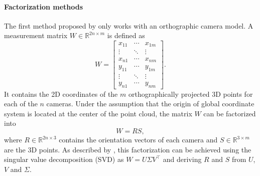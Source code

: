         	\paragraph{Factorization methods}
        		The first method proposed by \cite{tomasi1992factorization} only works with an orthographic camera model.
        		A measurement matrix $W \in \mathbb{R}^{2n \times m}$ is defined as
        		\begin{equation}
        			W =
        			\begin{bmatrix}
        			x_{11} & \cdots & x_{1m} \\ 
        			\vdots & \ddots & \vdots \\ 
        			x_{n1} & \cdots & x_{nm} \\ 
        			y_{11} & \cdots & y_{1m} \\ 
        			\vdots & \ddots  & \vdots \\ 
        			y_{n1} & \cdots & y_{nm}
        			\end{bmatrix}. 
        		\end{equation}
        		It contains the 2D coordinates of the $m$ orthographically projected 3D points for each of the $n$ cameras.
        		Under the assumption that the origin of global coordinate system is located at the center of the point cloud, the matrix $W$ can be factorized into
        		\begin{equation}
        			W = RS,
        		\end{equation}
        		where $R \in \mathbb{R}^{2n \times 3}$ contains the orientation vectors of each camera and $S \in \mathbb{R}^{3 \times m}$  are the 3D points.
        		As described by \cite{tomasi1992factorization}, this factorization can be achieved using the singular value decomposition (SVD) as $W = U \varSigma V^\top$ and deriving $R$ and $S$ from $U$, $V$ and $\varSigma$.
        		
        		
        		
        	
        	
        	
        
        
        
        